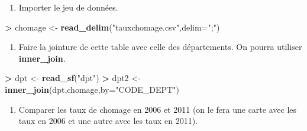 \documentclass[]{article}
\newenvironment{Shaded}{\begin{snugshade}}{\end{snugshade}}
\newcommand{\DataTypeTok}[1]{\textcolor[rgb]{0.13,0.29,0.53}{#1}}
\newcommand{\KeywordTok}[1]{\textcolor[rgb]{0.13,0.29,0.53}{\textbf{#1}}}
\newcommand{\NormalTok}[1]{#1}
\newcommand{\OperatorTok}[1]{\textcolor[rgb]{0.81,0.36,0.00}{\textbf{#1}}}
\newcommand{\StringTok}[1]{\textcolor[rgb]{0.31,0.60,0.02}{#1}}
\providecommand{\tightlist}{%
  \setlength{\itemsep}{0pt}\setlength{\parskip}{0pt}}
\theoremstyle{definition}
\theoremstyle{definition}
\theoremstyle{definition}
\theoremstyle{remark}
\begin{document}
\begin{enumerate}
\def\labelenumi{\arabic{enumi}.}
\tightlist
\item
  Importer le jeu de données.
\end{enumerate}

\begin{Shaded}
\begin{Highlighting}[]
\OperatorTok{>}\StringTok{ }\NormalTok{chomage <-}\StringTok{ }\KeywordTok{read_delim}\NormalTok{(}\StringTok{"tauxchomage.csv"}\NormalTok{,}\DataTypeTok{delim=}\StringTok{";"}\NormalTok{)}
\end{Highlighting}
\end{Shaded}

\begin{enumerate}
\def\labelenumi{\arabic{enumi}.}
\setcounter{enumi}{1}
\tightlist
\item
  Faire la jointure de cette table avec celle des départements. On pourra utiliser \textbf{inner\_join}.
\end{enumerate}

\begin{Shaded}
\begin{Highlighting}[]
\OperatorTok{>}\StringTok{ }\NormalTok{dpt <-}\StringTok{ }\KeywordTok{read_sf}\NormalTok{(}\StringTok{"dpt"}\NormalTok{)}
\OperatorTok{>}\StringTok{ }\NormalTok{dpt2 <-}\StringTok{ }\KeywordTok{inner_join}\NormalTok{(dpt,chomage,}\DataTypeTok{by=}\StringTok{"CODE_DEPT"}\NormalTok{)}
\end{Highlighting}
\end{Shaded}

\begin{enumerate}
\def\labelenumi{\arabic{enumi}.}
\setcounter{enumi}{2}
\tightlist
\item
  Comparer les taux de chomage en 2006 et 2011 (on le fera une carte avec les taux en 2006 et une autre avec les taux en 2011).
\end{enumerate}

\begin{Shaded}
\end{Shaded}
\end{document}
